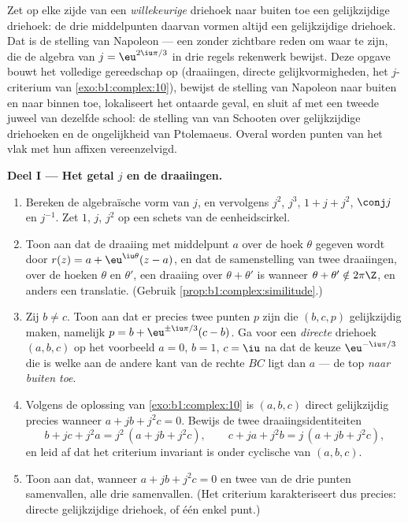 \begin{problem}\label{pb:b1:complex:1}
Zet op elke zijde van een \emph{willekeurige} driehoek naar buiten toe
een gelijkzijdige driehoek: de drie middelpunten daarvan vormen altijd
een gelijkzijdige driehoek. Dat is de stelling van
Napoleon --- een  zonder
zichtbare reden om waar te zijn, die de algebra van $j = \eu^{2\iu\pi/3}$
in drie regels rekenwerk bewijst. Deze opgave bouwt het volledige
gereedschap op (draaiingen, directe gelijkvormigheden, het
$j$-criterium van \cref{exo:b1:complex:10}), bewijst de stelling van
Napoleon naar buiten en naar binnen toe, lokaliseert het ontaarde geval,
en sluit af met een tweede juweel van dezelfde school: de stelling van
van Schooten over gelijkzijdige driehoeken en de ongelijkheid van
Ptolemaeus. Overal worden punten van het vlak met hun affixen
vereenzelvigd.

\medskip
\noindent\textbf{Deel I --- Het getal $j$ en de draaiingen.}
\begin{enumerate}
  \item Bereken de algebraïsche vorm van $j$, en vervolgens $j^2$, $j^3$,
        $1 + j + j^2$, $\conj j$ en $j^{-1}$. Zet $1$, $j$, $j^2$ op een
        schets van de eenheidscirkel.
  \item Toon aan dat de draaiing met middelpunt $a$ over de hoek
        $\theta$ gegeven wordt door $r(z) = a + \eu^{\iu\theta}(z - a)$,
        en dat de samenstelling van twee draaiingen, over de hoeken
        $\theta$ en $\theta'$, een draaiing over $\theta + \theta'$ is
        wanneer $\theta + \theta' \notin 2\pi\Z$, en anders een
        translatie. (Gebruik \cref{prop:b1:complex:similitude}.)
  \item Zij $b \neq c$. Toon aan dat er precies twee punten $p$ zijn die
        $(b, c, p)$ gelijkzijdig maken, namelijk $p = b +
        \eu^{\pm\iu\pi/3}(c - b)$. Ga voor een \emph{directe} driehoek
        $(a, b, c)$ op het voorbeeld $a = 0$, $b = 1$, $c = \iu$ na dat
        de keuze $\eu^{-\iu\pi/3}$ die is welke aan de andere kant van
        de rechte $BC$ ligt dan $a$ --- de top \emph{naar buiten toe}.
  \item Volgens de oplossing van \cref{exo:b1:complex:10} is $(a, b, c)$
        direct gelijkzijdig precies wanneer $a + jb + j^2c = 0$. Bewijs
        de twee draaiingsidentiteiten
        \[
        b + jc + j^2a = j^2\,(a + jb + j^2c),
        \qquad
        c + ja + j^2b = j\,(a + jb + j^2c),
        \]
        en leid af dat het criterium invariant is onder cyclische
         van $(a, b, c)$.
  \item Toon aan dat, wanneer $a + jb + j^2c = 0$ en twee van de drie
        punten samenvallen, alle drie samenvallen. (Het criterium
        karakteriseert dus precies: directe gelijkzijdige driehoek, of
        één enkel punt.)
\end{enumerate}


\end{problem}
